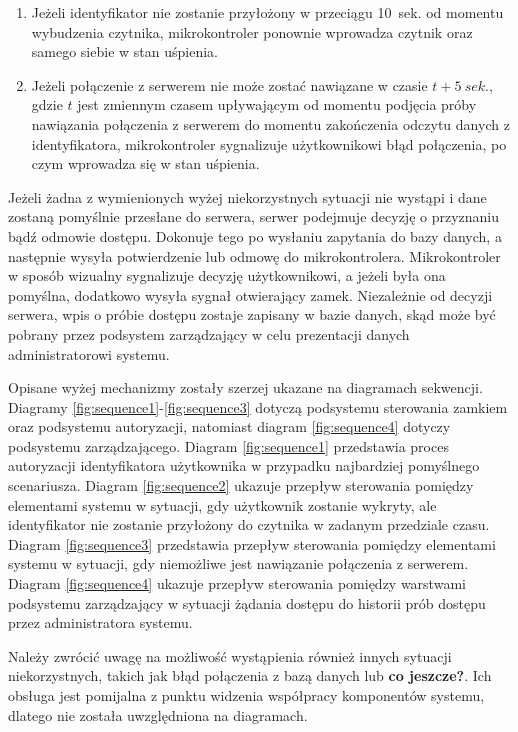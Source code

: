             \begin{enumerate}
                \item
                    Jeżeli identyfikator nie zostanie przyłożony w przeciągu 10~sek. od momentu wybudzenia czytnika, mikrokontroler ponownie wprowadza czytnik oraz samego siebie w stan uśpienia.
                \item
                    Jeżeli połączenie z serwerem nie może zostać nawiązane w czasie \(t + 5~sek.\), gdzie \(t\) jest zmiennym czasem upływającym od momentu podjęcia próby nawiązania połączenia z serwerem do momentu zakończenia odczytu danych z identyfikatora, mikrokontroler sygnalizuje użytkownikowi błąd połączenia, po czym wprowadza się w stan uśpienia.
            \end{enumerate}

            Jeżeli żadna z wymienionych wyżej niekorzystnych sytuacji nie wystąpi i dane zostaną pomyślnie przesłane do serwera, serwer podejmuje decyzję o przyznaniu bądź odmowie dostępu. Dokonuje tego po wysłaniu zapytania do bazy danych, a następnie wysyła potwierdzenie lub odmowę do mikrokontrolera. Mikrokontroler w sposób wizualny sygnalizuje decyzję użytkownikowi, a jeżeli była ona pomyślna, dodatkowo wysyła sygnał otwierający zamek. Niezależnie od decyzji serwera, wpis o próbie dostępu zostaje zapisany w bazie danych, skąd może być pobrany przez podsystem zarządzający w celu prezentacji danych administratorowi systemu.

            Opisane wyżej mechanizmy zostały szerzej ukazane na diagramach sekwencji. Diagramy \ref{fig:sequence1}-\ref{fig:sequence3} dotyczą podsystemu sterowania zamkiem oraz podsystemu autoryzacji, natomiast diagram \ref{fig:sequence4} dotyczy podsystemu zarządzającego. Diagram \ref{fig:sequence1} przedstawia proces autoryzacji identyfikatora użytkownika w przypadku najbardziej pomyślnego scenariusza. Diagram \ref{fig:sequence2} ukazuje przepływ sterowania pomiędzy elementami systemu w sytuacji, gdy użytkownik zostanie wykryty, ale identyfikator nie zostanie przyłożony do czytnika w zadanym przedziale czasu. Diagram \ref{fig:sequence3} przedstawia przepływ sterowania pomiędzy elementami systemu w sytuacji, gdy niemożliwe jest nawiązanie połączenia z serwerem. Diagram \ref{fig:sequence4} ukazuje przepływ sterowania pomiędzy warstwami podsystemu zarządzający w sytuacji żądania dostępu do historii prób dostępu przez administratora systemu.

            Należy zwrócić uwagę na możliwość wystąpienia również innych sytuacji niekorzystnych, takich jak błąd połączenia z bazą danych lub \textbf{co jeszcze?}. Ich obsługa jest pomijalna z punktu widzenia współpracy komponentów systemu, dlatego nie została uwzględniona na diagramach.

